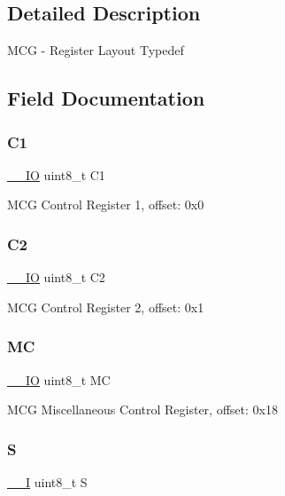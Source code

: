 \subsection{Detailed Description}
M\+CG -\/ Register Layout Typedef 

\subsection{Field Documentation}
\mbox{\label{struct_m_c_g___type_ad54aa92be9fc988e74d55d2d3daae8ad}} 
\subsubsection{\texorpdfstring{C1}{C1}}
{\footnotesize\ttfamily \mbox{\hyperlink{core__cm0plus_8h_aec43007d9998a0a0e01faede4133d6be}{\+\_\+\+\_\+\+IO}} uint8\+\_\+t C1}

M\+CG Control Register 1, offset\+: 0x0 \mbox{\label{struct_m_c_g___type_a4f920936a8fc32483b3ebd9b0674b450}} 
\subsubsection{\texorpdfstring{C2}{C2}}
{\footnotesize\ttfamily \mbox{\hyperlink{core__cm0plus_8h_aec43007d9998a0a0e01faede4133d6be}{\+\_\+\+\_\+\+IO}} uint8\+\_\+t C2}

M\+CG Control Register 2, offset\+: 0x1 \mbox{\label{struct_m_c_g___type_a092532c18bb122f73d67ea2ea2ee2d1a}} 
\subsubsection{\texorpdfstring{MC}{MC}}
{\footnotesize\ttfamily \mbox{\hyperlink{core__cm0plus_8h_aec43007d9998a0a0e01faede4133d6be}{\+\_\+\+\_\+\+IO}} uint8\+\_\+t MC}

M\+CG Miscellaneous Control Register, offset\+: 0x18 \mbox{\label{struct_m_c_g___type_ac8db14da050fcf50b52dc461c601cf95}} 
\subsubsection{\texorpdfstring{S}{S}}
{\footnotesize\ttfamily \mbox{\hyperlink{core__cm0plus_8h_af63697ed9952cc71e1225efe205f6cd3}{\+\_\+\+\_\+I}} uint8\+\_\+t S}

